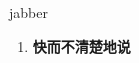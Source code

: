 
\begin{frame}
{\huge jabber}
\begin{center}
\begin{enumerate}\Large
  \item \textbf{快而不清楚地说}
\end{enumerate}
\end{center}
\end{frame}
